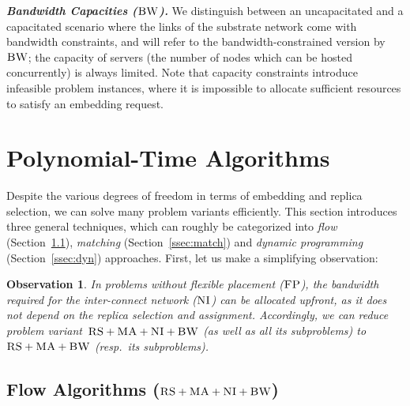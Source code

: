 \documentclass[preprint,12pt]{elsarticle}
\newcommand{\CC}{\textsc{NI}}
\newcommand{\FP}{\textsc{FP}}
\newcommand{\RS}{\textsc{RS}}
\newcommand{\BW}{\textsc{BW}}
\newcommand{\MA}{\textsc{MA}}
\newtheorem{obs}{Observation}
\newcommand{\CostTrans}{\ensuremath{b_1}}
\newcommand{\CostCom}{\ensuremath{b_2}}
\begin{document}


\textbf{\emph{Bandwidth Capacities ($\BW$).}}
We distinguish between an uncapacitated and a capacitated scenario where the links
of the substrate network come with bandwidth
constraints, and will refer to the bandwidth-constrained version by~$\BW$; the capacity of servers
(the number of nodes which can be hosted concurrently) is always limited.
Note that capacity constraints introduce infeasible problem instances, where it is impossible to
allocate sufficient resources to satisfy an embedding request.


\section{Polynomial-Time Algorithms}\label{sec:poly}


Despite the various degrees of freedom in terms of embedding and replica selection,
we can solve many problem variants efficiently.
 This section introduces three general techniques,
 which can roughly be categorized into
 \emph{flow} (Section~\ref{ssec:flow}), \emph{matching} (Section~\ref{ssec:match}) and \emph{dynamic programming}
 (Section~\ref{ssec:dyn}) approaches.
First, let us make a simplifying observation:
\begin{obs}\label{obs:nofp}
In problems without flexible placement ($\FP$),
the bandwidth required
for the inter-connect network ($\CC$) can be allocated \emph{upfront}, 
as it
does not depend on the replica
selection and assignment.
Accordingly, we can reduce problem variant~$\RS+\MA+\CC +\BW$ (as well as all its subproblems)
to~$\RS+\MA+\BW$ (resp.~its subproblems).
\end{obs}

\subsection{Flow Algorithms ($\RS+\MA+\CC+\BW$)}\label{ssec:flow}
\end{document}

